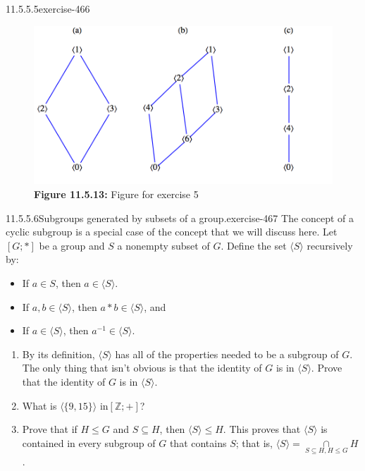 \documentclass[twoside,10pt,]{book}
\numberwithin{equation}{section}
\begin{document}
\begin{divisionsolution}{11.5.5.5}{}{exercise-466}
%
\begin{figure}
\centering
\includegraphics[width=0.75\linewidth]{images/fig-sol-11-5-5.png}
\caption*{\textbf{Figure 11.5.13:} Figure for exercise 5}
\end{figure}
\end{divisionsolution}%
\begin{divisionsolution}{11.5.5.6}{Subgroups generated by subsets of a group.}{exercise-467}%
\hypertarget{p-4140}{}%
The concept of a cyclic subgroup is a special case of the concept that we will discuss here. Let \([G; * ]\) be a group and \(S\) a nonempty subset of \(G\). Define the set \(\langle S \rangle\) recursively by:\leavevmode%
\begin{itemize}[label=\textbullet]
\item{}\hypertarget{p-4141}{}%
If \(a\in S\), then \(a\in  \langle S \rangle\).%
\item{}\hypertarget{p-4142}{}%
If \(a, b \in \langle S \rangle\), then \(a * b \in \langle S \rangle\), and%
\item{}\hypertarget{p-4143}{}%
If \(a \in \langle S \rangle\), then \(a^{-1}\in \langle S \rangle\).%
\end{itemize}
%
\par
\hypertarget{p-4144}{}%
\leavevmode%
\begin{enumerate}[label=(\alph*)]
\item\hypertarget{li-1888}{}\hypertarget{p-4145}{}%
By its definition, \(\langle S \rangle\)  has all of the properties needed to be a subgroup of \(G\). The only thing that isn't obvious is that the identity of \(G\) is in \(\langle S \rangle\).  Prove that the identity of \(G\) is in \(\langle S \rangle\).%
\item\hypertarget{li-1889}{}\hypertarget{p-4146}{}%
What is \(\langle\{9, 15\}\rangle\) in\([\mathbb{Z}; +]\)?%
\item\hypertarget{li-1890}{}\hypertarget{p-4147}{}%
Prove that if \(H \leq  G\) and \(S \subseteq  H\), then \(\langle S \rangle\leq H\). This proves that \(\langle S \rangle\) is contained in every subgroup of \(G\) that contains \(S\); that is, \(\langle S \rangle =\underset{S\subseteq H, H\leq G}{\cap }H\).%

\end{enumerate}
\end{divisionsolution}
\end{document}

